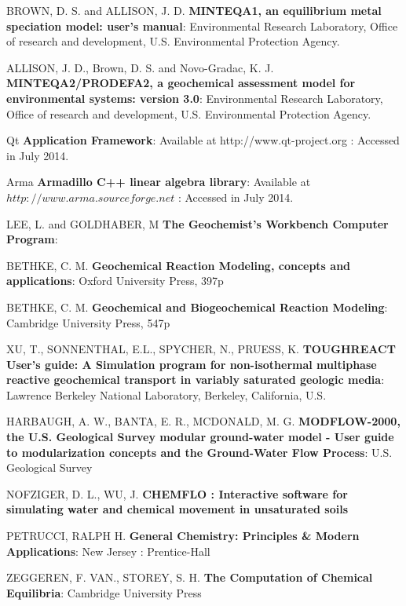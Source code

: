 \documentclass[ppgc,mestrado,english]{iiufrgs}
\begin{document}
\begin{thebibliography}{este-parametro-nao-eh-usado-pelo-estilo-ABNT}
 BROWN, D. S. and ALLISON, J. D.
\textbf{MINTEQA1, an equilibrium metal speciation model: user's manual}: Environmental Research Laboratory, Office of research and development, U.S. Environmental Protection Agency.

 ALLISON, J. D., Brown, D. S. and Novo-Gradac, K. J.
\textbf{MINTEQA2/PRODEFA2, a geochemical assessment model for environmental systems: version 3.0}: Environmental Research Laboratory, Office of research and development, U.S. Environmental Protection Agency.

 Qt
\textbf{Application Framework}: Available at http://www.qt-project.org : Accessed in July 2014.

 Arma
\textbf{Armadillo C++ linear algebra library}: Available at $http://www.arma.sourceforge.net$ : Accessed in July 2014.

 LEE, L. and GOLDHABER, M
\textbf{The Geochemist's Workbench Computer Program}: 

 BETHKE, C. M.
\textbf{Geochemical Reaction Modeling, concepts and applications}: Oxford University Press, 397p

 BETHKE, C. M.
\textbf{Geochemical and Biogeochemical Reaction Modeling}: Cambridge University Press, 547p

 XU, T., SONNENTHAL, E.L., SPYCHER, N., PRUESS, K.
\textbf{TOUGHREACT User's guide: A Simulation program for non-isothermal multiphase reactive geochemical transport in variably saturated geologic media}: Lawrence Berkeley National Laboratory, Berkeley, California, U.S.

 HARBAUGH, A. W., BANTA, E. R., MCDONALD, M. G.
\textbf{MODFLOW-2000, the U.S. Geological Survey modular ground-water model - User guide to modularization concepts and the Ground-Water Flow Process}: U.S. Geological Survey

 NOFZIGER, D. L., WU, J.
\textbf{CHEMFLO : Interactive software for simulating water and chemical movement in unsaturated soils}

 PETRUCCI, RALPH H.
\textbf{General Chemistry: Principles \& Modern Applications}: New Jersey : Prentice-Hall

 ZEGGEREN, F. VAN., STOREY, S. H. 
\textbf{The Computation of Chemical Equilibria}: Cambridge University Press


\end{thebibliography}
\end{document}
